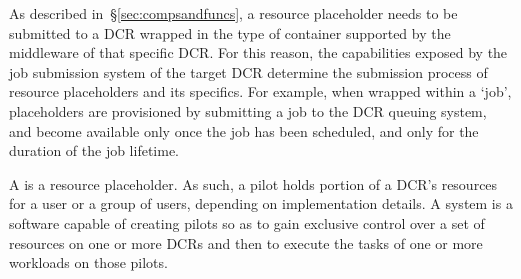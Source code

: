 \documentclass{sig-alternate}
\begin{document}



As described in~\S\ref{sec:compsandfuncs}, a resource placeholder needs to be
submitted to a DCR wrapped in the type of container supported by the middleware
of that specific DCR. For this reason, the capabilities exposed by the job
submission system of the target DCR determine the submission process of resource
placeholders and its specifics. For example, when wrapped within a `job',
placeholders are provisioned by submitting a job to the DCR queuing system, and
become available only once the job has been scheduled, and only for the duration
of the job lifetime.



A \pilot is a resource placeholder. As such, a pilot holds portion of a DCR's
resources for a user or a group of users, depending on implementation details. A
\pilotjob system is a software capable of creating pilots so as to gain
exclusive control over a set of resources on one or more DCRs and then to
execute the tasks of one or more workloads on those pilots.
\end{document}
